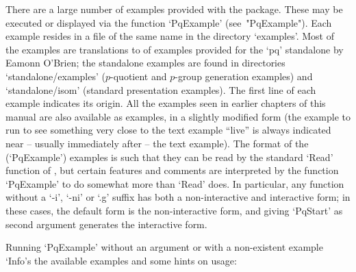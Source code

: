 

There are a large number of examples provided with the {\ANUPQ}  package.
These  may  be  executed  or  displayed  via  the  function   `PqExample'
(see~"PqExample"). Each example resides in a file of the same name in the
directory `examples'. Most of the examples are translations to {\GAP}  of
examples  provided  for  the  `pq'  standalone  by  Eamonn  O'Brien;  the
standalone  examples  are  found  in  directories   `standalone/examples'
($p$-quotient and $p$-group generation  examples)  and  `standalone/isom'
(standard  presentation  examples).  The  first  line  of  each   example
indicates its origin. All the examples seen in earlier chapters  of  this
manual are also available as examples, in a slightly modified  form  (the
example to run to see something very close to the text  example  ``live''
is always indicated  near  --  usually  immediately  after  --  the  text
example). The format of the (`PqExample') examples is such that they  can
be read by the standard `Read' function of {\GAP}, but  certain  features
and comments are interpreted by the function `PqExample' to  do  somewhat
more than `Read' does. In particular, any function without a `-i',  `-ni'
or `.g' suffix has both a non-interactive and interactive form; in  these
cases, the default form is the non-interactive form, and giving `PqStart'
as second argument generates the interactive form.

Running `PqExample' without an argument or with  a  non-existent  example
`Info's the available examples and some hints on usage:

